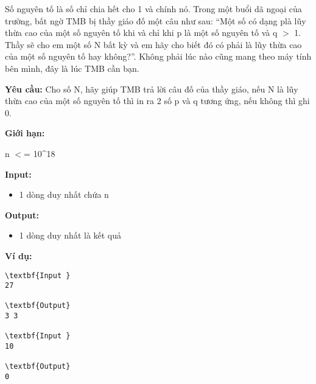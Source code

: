 

Số nguyên tố là số chỉ chia hết cho 1 và chính nó. Trong một buổi dã ngoại của trường, bất ngờ TMB bị thầy giáo đố một câu như sau: “Một số có dạng p\textasciicircumq là lũy thừa cao của một số nguyên tố khi và chỉ khi p là một số nguyên tố và q $>$ 1. Thầy sẽ cho em một số N bất kỳ và em hãy cho biết đó có phải là lũy thừa cao của một số nguyên tố hay không?”. Không phải lúc nào cũng mang theo máy tính bên mình, đây là lúc TMB cần bạn.

\textbf{Yêu cầu: } Cho số N, hãy giúp TMB trả lời câu đố của thầy giáo, nếu N là lũy thừa cao của một số nguyên tố thì in ra 2 số p và q tương ứng, nếu không thì ghi 0.

\textbf{Giới hạn: }

n $<$= 10\textasciicircum18

\textbf{Input: }
\begin{itemize}
	\item 

1 dòng duy nhất chứa n
\end{itemize}

\textbf{Output: }
\begin{itemize}
	\item 

1 dòng duy nhất là kết quả
\end{itemize}

\textbf{Ví dụ: }
\begin{verbatim}
\textbf{Input }
27

\textbf{Output}
3 3

\textbf{Input }
10

\textbf{Output}
0\end{verbatim}